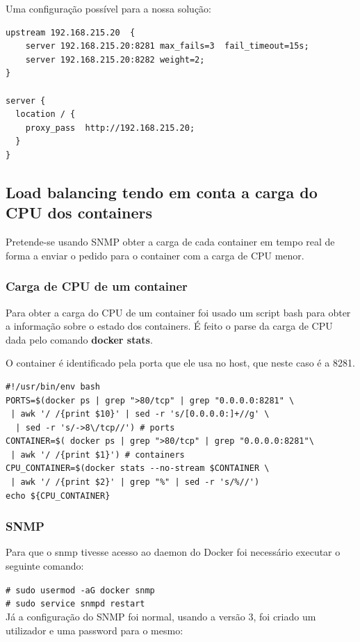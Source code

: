 \documentclass[pdftex,12pt,a4paper]{report}
\newcommand{\shellcmd}[1]{\indent\indent\texttt{\footnotesize\# #1}\\}
\begin{document}
Uma configuração possível para a nossa solução:

\begin{lstlisting}
upstream 192.168.215.20  {
    server 192.168.215.20:8281 max_fails=3  fail_timeout=15s;
    server 192.168.215.20:8282 weight=2;
}

server {
  location / {
    proxy_pass  http://192.168.215.20;
  }
}
\end{lstlisting}

\subsection{Load balancing tendo em conta a carga do CPU dos containers}

Pretende-se usando SNMP obter a carga de cada container em tempo real de forma a enviar o pedido para o container com a carga de CPU menor.


\subsubsection{Carga de CPU de um container}

Para obter a carga do CPU de um container foi usado um script bash para obter a informação sobre o estado dos containers.  É feito o parse da carga de CPU dada pelo comando \textbf{docker stats}.

O container é identificado pela porta que ele usa no host, que neste caso é a 8281.

\begin{lstlisting}
#!/usr/bin/env bash
PORTS=$(docker ps | grep ">80/tcp" | grep "0.0.0.0:8281" \
 | awk '/ /{print $10}' | sed -r 's/[0.0.0.0:]+//g' \
  | sed -r 's/->8\/tcp//') # ports
CONTAINER=$( docker ps | grep ">80/tcp" | grep "0.0.0.0:8281"\
 | awk '/ /{print $1}') # containers
CPU_CONTAINER=$(docker stats --no-stream $CONTAINER \
 | awk '/ /{print $2}' | grep "%" | sed -r 's/%//')
echo ${CPU_CONTAINER}
\end{lstlisting}

\subsubsection{SNMP}

Para que o snmp tivesse acesso ao daemon do Docker foi necessário executar o seguinte comando:

\shellcmd{sudo usermod -aG docker snmp}
\shellcmd{sudo service snmpd restart}

Já a configuração do SNMP foi normal, usando a versão 3, foi criado um utilizador e uma password para o mesmo:
\end{document}
